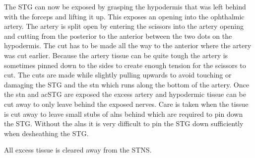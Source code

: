 The \ac{STG} can now be exposed by grasping the hypodermis that was left behind with the forceps and lifting it up. This exposes an opening into the ophthalmic artery. The artery is split open by entering the scissors into the artery opening and cutting from the posterior to the anterior between the two dots on the hypodermis. The cut has to be made all the way to the anterior where the artery was cut earlier. Because the artery tissue can be quite tough the artery is sometimes pinned down to the sides to create enough tension for the scissors to cut. The cuts are made while slightly pulling upwards to avoid touching or damaging the STG and the \ac{stn} which runs along the bottom of the artery. Once the \ac{stn} and ac{STG} are exposed the excess artery and hypodermic tissue can be cut away to only leave behind the exposed nerves. Care is taken when the tissue is cut away to leave small stubs of \acp{aln} behind which are required to pin down the \ac{STG}. Without the \acp{aln} it is very difficult to pin the \ac{STG} down sufficiently when desheathing the \ac{STG}.

All excess tissue is cleared away from the \ac{STNS}.




